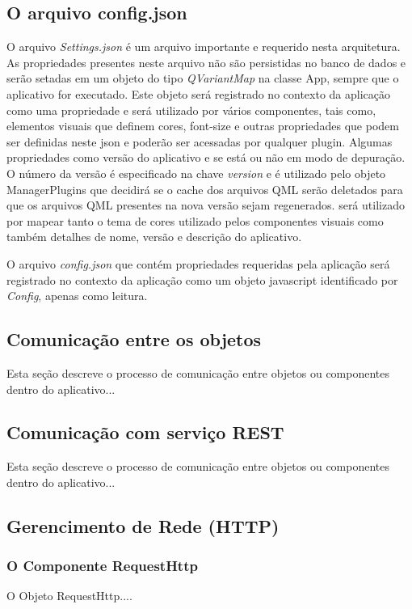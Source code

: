 \subsection{O arquivo config.json}\label{sec:solucao-desenvolvida}
O arquivo \textit{Settings.json} é um arquivo importante e requerido nesta arquitetura. As propriedades presentes neste arquivo não são persistidas no banco de dados e serão setadas em um objeto do tipo \textit{QVariantMap} na classe App, sempre que o aplicativo for executado. Este objeto será registrado no contexto da aplicação como uma propriedade e será utilizado por vários componentes, tais como, elementos visuais que definem cores, font-size e outras propriedades que podem ser definidas neste json e poderão ser acessadas por qualquer plugin. Algumas propriedades como versão do aplicativo e se está ou não em modo de depuração. O número da versão é especificado na chave \textit{version} e é utilizado pelo objeto ManagerPlugins que decidirá se o cache dos arquivos QML serão deletados para que os arquivos QML presentes na nova versão sejam regenerados. será utilizado por mapear tanto o tema de cores utilizado pelos componentes visuais como também detalhes de nome, versão e descrição do aplicativo.


O arquivo \textit{config.json} que contém propriedades requeridas pela aplicação será registrado no contexto da aplicação como um objeto javascript identificado por \textit{Config}, apenas como leitura.

\subsection{Comunicação entre os objetos}
Esta seção descreve o processo de comunicação entre objetos ou componentes dentro do aplicativo...


\subsection{Comunicação com serviço REST}
Esta seção descreve o processo de comunicação entre objetos ou componentes dentro do aplicativo...


\subsection{Gerencimento de Rede (HTTP)}\label{sec:solucao-desenvolvida}
\subsubsection{O Componente RequestHttp}\label{sec:solucao-desenvolvida}
O Objeto RequestHttp....



